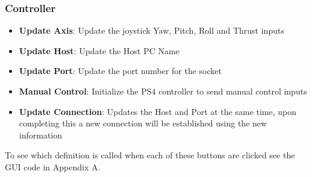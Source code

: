 \subsubsection{Controller}
\begin{itemize}
	\item \textbf{Update Axis}: Update the joystick Yaw, Pitch, Roll and Thrust inputs
	\item \textbf{Update Host}: Update the Host PC Name
	\item \textbf{Update Port}: Update the port number for the socket
	\item \textbf{Manual Control}: Initialize the PS4 controller to send manual control inputs
	\item \textbf{Update Connection}: Updates the Host and Port at the same time, upon completing this a new connection will be established using the new information
\end{itemize}
To see which definition is called when each of these buttons are clicked see the GUI code in Appendix A. 